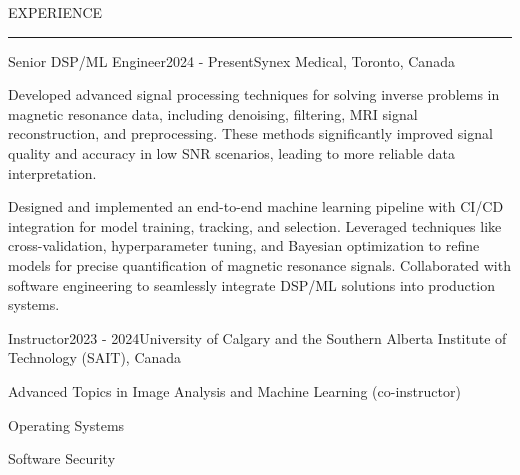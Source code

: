 \documentclass{resume} %
\renewenvironment{rSection}[1]{
\sectionskip
\textcolor{RoyalPurple}{\MakeUppercase{#1}}
\sectionlineskip
\hrule
\begin{list}{}{
\setlength{\leftmargin}{1.5em}
}
\item[]
}{
\end{list}
}
\begin{document}
\begin{rSection}{EXPERIENCE}

\begin{rSubsection}{Senior DSP/ML Engineer}{2024 - Present}{Synex Medical, Toronto, Canada}{}
    \item Developed advanced signal processing techniques for solving inverse problems in magnetic resonance data, including denoising, filtering, MRI signal reconstruction, and preprocessing. These methods significantly improved signal quality and accuracy in low SNR scenarios, leading to more reliable data interpretation.
    \item Designed and implemented an end-to-end machine learning pipeline with CI/CD integration for model training, tracking, and selection. Leveraged techniques like cross-validation, hyperparameter tuning, and Bayesian optimization to refine models for precise quantification of magnetic resonance signals. Collaborated with software engineering to seamlessly integrate DSP/ML solutions into production systems.
\end{rSubsection}


\begin{rSubsection}{Instructor}{2023 - 2024}{University of Calgary and the Southern Alberta Institute of Technology (SAIT), Canada}{}
    \item Advanced Topics in Image Analysis and Machine Learning  (co-instructor)
    \item Operating Systems
    \item Software Security
\end{rSubsection}


\end{rSection}
\end{document}
